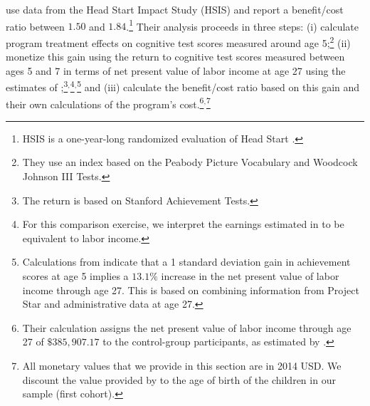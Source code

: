 \citet{Kline_Walters_2016_QJE} use data from the Head Start Impact Study (HSIS) and report a benefit/cost ratio between $1.50$ and $1.84$.\footnote{HSIS is a one-year-long randomized evaluation of Head Start \citep{Puma_Bell_etal_2010_HeadStartImpact}.} Their analysis proceeds in three steps: (i) calculate program treatment effects on cognitive test scores measured around age 5;\footnote{They use an index based on the Peabody Picture Vocabulary and Woodcock Johnson III Tests.} (ii) monetize this gain using the return to cognitive test scores measured between ages 5 and 7 in terms of net present value of labor income at age 27 using the estimates of \citet{Chetty_Friedman_etal_2011_QJoE};\footnote{The \citet{Chetty_Friedman_etal_2011_QJoE} return is based on Stanford Achievement Tests.}$^,$\footnote{For this comparison exercise, we interpret the earnings estimated in \citet{Chetty_Friedman_etal_2011_QJoE} to be equivalent to labor income.}$^,$\footnote{Calculations from \citet{Chetty_Friedman_etal_2011_QJoE} indicate that a 1 standard deviation gain in achievement scores at age 5 implies a $13.1\%$ increase in the net present value of labor income through age 27. This is based on combining information from Project Star and administrative data at age 27.} and (iii) calculate the benefit/cost ratio based on this gain and their own calculations of the program's cost.\footnote{Their calculation assigns the net present value of labor income through age 27 of $\$385,907.17$ to the control-group participants, as estimated by  \citet{Chetty_Friedman_etal_2011_QJoE}.}$^,$\footnote{All monetary values that we provide in this section are in 2014 USD. We discount the value provided by \citet{Chetty_Friedman_etal_2011_QJoE} to the age of birth of the children in our sample (first cohort).}

